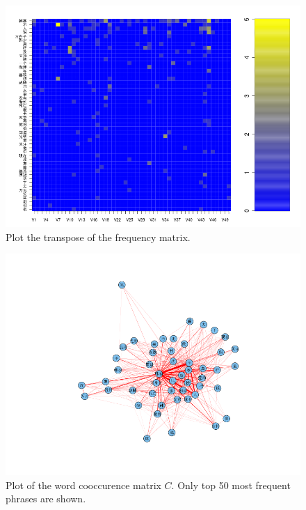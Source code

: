\documentclass[11pt]{article}
\newcommand{\1}[1]{{\mathbf 1}\left\{#1\right\}}        %
\begin{document}


\begin{center}
\begin{figure}[tb]
   \centering
   \includegraphics[width=\textwidth]{../wordFreqMat.png} 
      \caption{Plot the transpose of the frequency matrix.}
   \label{fig:freqmat}
\end{figure}
\end{center}


\begin{center}
\begin{figure}[tb]
   \centering
   \includegraphics[width=\textwidth]{../coocurResults/cooccurNetwork.png} 
      \caption{Plot of the word cooccurence matrix $C$. Only top 50 most frequent phrases are shown.}
   \label{fig:coocurmat}
\end{figure}
\end{center}
\end{document}
